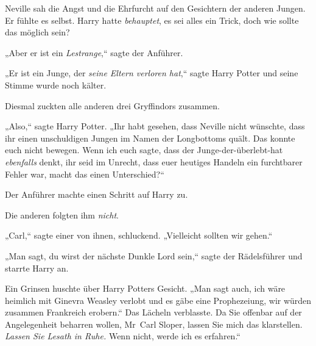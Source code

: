 Neville sah die Angst und die Ehrfurcht auf den Gesichtern der anderen Jungen. Er fühlte es selbst. Harry hatte \emph{behauptet}, es sei alles ein Trick, doch wie sollte das möglich sein?

„Aber er ist ein \emph{Lestrange},“ sagte der Anführer.

„Er ist ein Junge, der \emph{seine Eltern verloren hat},“ sagte Harry Potter und seine Stimme wurde noch kälter.

Diesmal zuckten alle anderen drei Gryffindors zusammen.

„Also,“ sagte Harry Potter. „Ihr habt gesehen, dass Neville nicht wünschte, dass ihr einen unschuldigen Jungen im Namen der Longbottoms quält. Das konnte euch nicht bewegen. Wenn ich euch sagte, dass der Junge-der-überlebt-hat \emph{ebenfalls} denkt, ihr seid im Unrecht, dass euer heutiges Handeln ein furchtbarer Fehler war, macht das einen Unterschied?“

Der Anführer machte einen Schritt auf Harry zu.

Die anderen folgten ihm \emph{nicht}.

„Carl,“ sagte einer von ihnen, schluckend. „Vielleicht sollten wir gehen.“

„Man sagt, du wirst der nächste Dunkle Lord sein,“ sagte der Rädelsführer und starrte Harry an.

Ein Grinsen huschte über Harry Potters Gesicht. „Man sagt auch, ich wäre heimlich mit Ginevra Weasley verlobt und es gäbe eine Prophezeiung, wir würden zusammen Frankreich erobern.“ Das Lächeln verblasste. Da Sie offenbar auf der Angelegenheit beharren wollen, Mr~Carl Sloper, lassen Sie mich das klarstellen. \emph{Lassen Sie Lesath in Ruhe.} Wenn nicht, werde ich es erfahren.“

